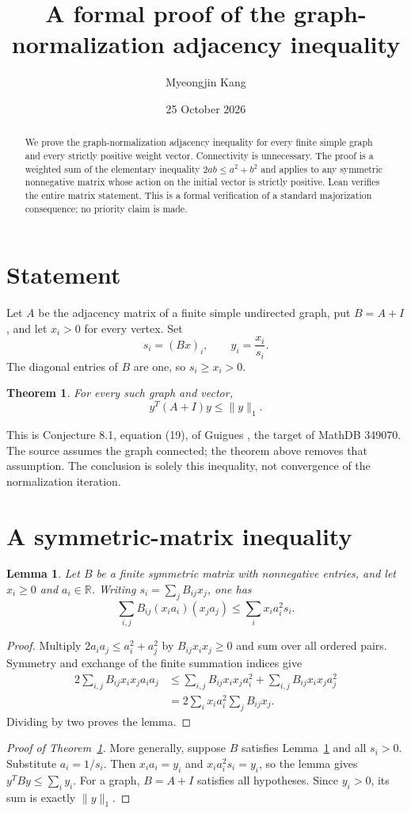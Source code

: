 \documentclass[11pt]{article}
\title{A formal proof of the graph-normalization adjacency inequality}
\author{Myeongjin Kang}
\date{25 October 2026}
\newtheorem{theorem}{Theorem}
\newtheorem{lemma}{Lemma}
\begin{document}
\maketitle
\begin{abstract}
We prove the graph-normalization adjacency inequality for every finite simple graph and every strictly positive weight vector. Connectivity is unnecessary. The proof is a weighted sum of the elementary inequality $2ab\leq a^2+b^2$ and applies to any symmetric nonnegative matrix whose action on the initial vector is strictly positive. Lean verifies the entire matrix statement. This is a formal verification of a standard majorization consequence; no priority claim is made.
\end{abstract}
\section{Statement}
Let $A$ be the adjacency matrix of a finite simple undirected graph, put $B=A+I$, and let $x_i>0$ for every vertex. Set
\[
 s_i=(Bx)_i,\qquad y_i=\frac{x_i}{s_i}.
\]
The diagonal entries of $B$ are one, so $s_i\geq x_i>0$.
\begin{theorem}\label{thm:graph}
For every such graph and vector,
\[
 y^T(A+I)y\leq \lVert y\rVert_1.
\]
\end{theorem}
This is Conjecture 8.1, equation (19), of Guigues \cite{original}, the target of MathDB 349070. The source assumes the graph connected; the theorem above removes that assumption. The conclusion is solely this inequality, not convergence of the normalization iteration.
\section{A symmetric-matrix inequality}
\begin{lemma}\label{lem:weighted}
Let $B$ be a finite symmetric matrix with nonnegative entries, and let $x_i\geq0$ and $a_i\in\mathbb R$. Writing $s_i=\sum_jB_{ij}x_j$, one has
\[
 \sum_{i,j}B_{ij}(x_i a_i)(x_j a_j)\leq\sum_i x_i a_i^2s_i.
\]
\end{lemma}
\begin{proof}
Multiply $2a_i a_j\leq a_i^2+a_j^2$ by $B_{ij}x_i x_j\geq0$ and sum over all ordered pairs. Symmetry and exchange of the finite summation indices give
\begin{align*}
2\sum_{i,j}B_{ij}x_i x_j a_i a_j
&\leq\sum_{i,j}B_{ij}x_i x_j a_i^2+\sum_{i,j}B_{ij}x_i x_j a_j^2\\
&=2\sum_i x_i a_i^2\sum_j B_{ij}x_j.
\end{align*}
Dividing by two proves the lemma.
\end{proof}
\begin{proof}[Proof of Theorem~\ref{thm:graph}]
More generally, suppose $B$ satisfies Lemma~\ref{lem:weighted} and all $s_i>0$. Substitute $a_i=1/s_i$. Then $x_i a_i=y_i$ and $x_i a_i^2s_i=y_i$, so the lemma gives $y^TBy\leq\sum_i y_i$. For a graph, $B=A+I$ satisfies all hypotheses. Since $y_i>0$, its sum is exactly $\lVert y\rVert_1$.
\end{proof}
\end{document}

